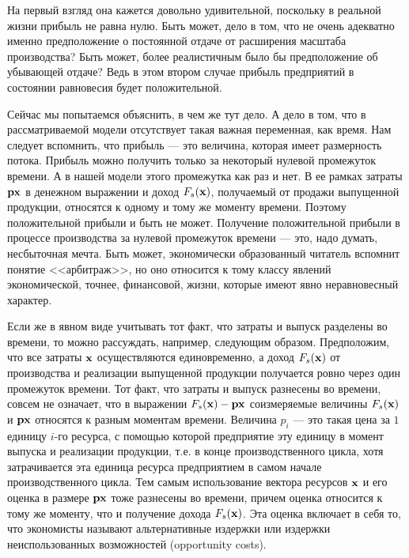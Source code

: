     На первый взгляд она кажется довольно удивительной, поскольку в
    реальной жизни прибыль не равна нулю. Быть может, дело в том, что
    не очень адекватно именно предположение о постоянной отдаче от
    расширения масштаба производства? Быть может, более реалистичным было бы
    предположение об убывающей отдаче? Ведь в этом втором случае прибыль
    предприятий в состоянии равновесия будет положительной.

    Сейчас мы попытаемся объяснить, в чем же тут дело. А дело в том,
    что в рассматриваемой модели отсутствует такая важная
    переменная, как время. Нам следует вспомнить, что прибыль ---
    это величина, которая имеет размерность потока. Прибыль можно
    получить только за некоторый нулевой промежуток времени. А в нашей
    модели этого промежутка как раз и нет. В ее рамках затраты
    $\mathbf{p}\mathbf{x}$ в денежном выражении и
    доход $F_{s}(\mathbf{x})$, получаемый от продажи выпущенной продукции,
    относятся к одному и тому же моменту
    времени. Поэтому положительной прибыли и быть не может.
    Получение положительной прибыли  в процессе
    производства за нулевой промежуток
    времени --- это, надо думать, несбыточная мечта. Быть может,
    экономически образованный читатель вспомнит понятие
    <<арбитраж>>, но оно относится к тому классу явлений
    экономической, точнее, финансовой, жизни, которые имеют явно неравновесный характер.

    Если же в явном виде учитывать тот факт, что затраты и выпуск
    разделены во времени, то можно рассуждать, например, следующим
    образом. Предположим, что все затраты $\mathbf{x}$ осуществляются
    единовременно, а доход $F_{s}(\mathbf{x})$ от  производства и
    реализации выпущенной продукции получается ровно через один
    промежуток времени. Тот факт, что затраты и выпуск разнесены во
    времени, совсем не означает, что в выражении
    $F_{s}(\mathbf{x})-\mathbf{p}\mathbf{x}$ соизмеряемые величины
    $F_{s}(\mathbf{x})$ и $\mathbf{p}\mathbf{x}$ относятся к разным моментам
    времени. Величина $p_{i}$ --- это такая цена за $1$ единицу  $i$-го ресурса,
    с помощью которой предприятие эту единицу в момент выпуска и
    реализации продукции, т.е. в конце производственного цикла,
    хотя
    затрачивается эта единица ресурса предприятием в самом
    начале производственного цикла. Тем самым
    использование вектора ресурсов $\mathbf{x}$ и его оценка в
    размере $\mathbf{p}\mathbf{x}$ тоже разнесены во
    времени, причем оценка относится к тому же моменту, что и
    получение дохода $F_{s}(\mathbf{x})$. Эта оценка включает в себя то,
    что экономисты называют альтернативные издержки или издержки
    неиспользованных возможностей (opportunity costs).

